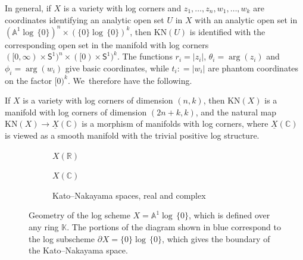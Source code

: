 \documentclass[10pt]{amsart}
\theoremstyle{definition}
\theoremstyle{remark}
\newcommand{\CC}{\mathbb{C}}
\newcommand{\KK}{\mathbb{K}}
\newcommand{\RR}{\mathbb{R}}
\newcommand{\AF}{\mathbb{A}}
\newcommand{\halfspc}[1]{[0,\infty)^{#1}}
\newcommand{\logcyl}{\AF^1 \log\, \{0\}}
\newcommand{\logcirc}{\{0\} \log\, \{0\}}
\newcommand{\defas}{\mathrel{\mathop:}=}
\newcommand{\bdX}[1][]{\partial^{#1} X}
\newcommand{\uX}{\underline{X}}
\newcommand{\KN}[1]{\mathrm{KN}(#1)}
\newcommand{\unitcirc}{\mathsf{S}^{1}}
\begin{document}
In general, if $X$ is a variety with log corners and $z_1,\ldots,z_n,w_1,\ldots,w_k$ are coordinates identifying an analytic open set $U$ in $X$ with an analytic open set in $(\logcyl)^n\times(\logcirc)^k$, then $\KN{U}$ is identified with the corresponding open set in the manifold with log corners $(\halfspc{} \times \unitcirc)^n \times ([0)\times\unitcirc)^k$. The functions $r_i = |z_i|$, $\theta_i = \arg(z_i)$ and $\phi_i = \arg(w_i)$ give basic coordinates, while $t_i \defas |w_i|$ are phantom coordinates on the factor $[0)^k$. We~therefore have the following.

\begin{proposition}
If $X$ is a variety with log corners of dimension $(n,k)$, then $\KN{X}$ is a manifold with log corners of dimension $(2n+k,k)$, and the natural map $\KN{X} \to \uX(\CC)$ is a morphism of manifolds with log corners, where $\uX(\CC)$ is viewed as a smooth manifold with the trivial positive log structure.
\end{proposition}

\begin{figure}
\centering
\begin{subfigure}[t]{.32\linewidth}
\centering{}
\caption{$X(\RR)$}
\end{subfigure}
\hfill
\begin{subfigure}[t]{.32\linewidth}
\centering
{}
\caption{$X(\CC)$}
\end{subfigure}
\hfill
\begin{subfigure}[t]{.32\linewidth}
\centering
{}
\caption{Kato--Nakayama spaces, real and complex}\label{fig:a1-real-KN-log-corner}
\end{subfigure}
\caption{Geometry of the log scheme $X = \logcyl$, which is defined over any ring $\KK$. The portions of the diagram shown in blue correspond to the log subscheme $\bdX = \logcirc$, which gives the boundary of the Kato--Nakayama space.}\label{fig:a1-real-KN}
\label{fig:enter-label}
\end{figure}
\end{document}
